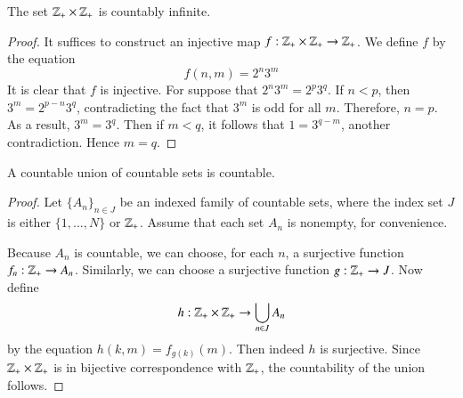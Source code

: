     \begin{corollary}
        The set $\mathbb Z_+\times \mathbb Z_+$ is countably infinite.
    \end{corollary}
    \begin{proof}
        It suffices to construct an injective map $f:\mathbb Z_+\times \mathbb Z_+\rightarrow \mathbb Z_+$. We define $f$ by the equation $$f(n,m) = 2^n3^m$$ It is clear that $f$ is injective. For suppose that $2^n3^m = 2^p3^q$. If $n < p$, then $3^m = 2^{p-n}3^q$, contradicting the fact that $3^m$ is odd for all $m$. Therefore, $n = p$. As a result, $3^m = 3^q$. Then if $m < q$, it follows that $1 = 3^{q-m}$, another contradiction. Hence $m = q$.
    \end{proof}


    \begin{theorem}
        A countable union of countable sets is countable.
    \end{theorem}
    \begin{proof}
        Let $\{A_n\}_{n\in J}$ be an indexed family of countable sets, where the index set $J$ is either $\{1,...,N\}$ or $\mathbb Z_+$. Assume that each set $A_n$ is nonempty, for convenience.

        Because $A_n$ is countable, we can choose, for each $n$, a surjective function $f_n:\mathbb Z_+\rightarrow A_n$. Similarly, we can choose a surjective function $g:\mathbb Z_+\rightarrow J$. Now define \begin{equation*}
            h:\mathbb Z_+\times \mathbb Z_+\rightarrow \bigcup\limits_{n\in J}A_n
        \end{equation*}
        by the equation $h(k,m) = f_{g(k)}(m)$. Then indeed $h$ is surjective. Since $\mathbb Z_+\times\mathbb Z_+$ is in bijective correspondence with $\mathbb Z_+$, the countability of the union follows.
    \end{proof}

